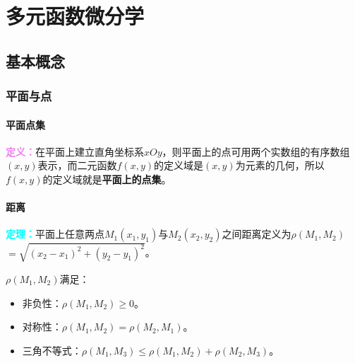 \setcounter{tocdepth}{4}
\setcounter{secnumdepth}{4}
\renewcommand{\baselinestretch}{1.5}
\chapter{多元函数微分学}
\section{基本概念}
\subsection{平面与点}
\subsubsection{平面点集}

\textcolor{violet}{\textbf{定义：}}在平面上建立直角坐标系$xOy$，则平面上的点可用两个实数组的有序数组$(x,y)$表示，而二元函数$f(x,y)$的定义域是$(x,y)$为元素的几何，所以$f(x,y)$的定义域就是\textbf{平面上的点集}。

\subsubsection{距离}

\textcolor{aqua}{\textbf{定理：}}平面上任意两点$M_1(x_1,y_1)$与$M_2(x_2,y_2)$之间距离定义为$\rho(M_1,M_2)$\\$=\sqrt{(x_2-x_1)^2+(y_2-y_1)^2}$。

$\rho(M_1,M_2)$满足：

\begin{itemize}
    \item 非负性：$\rho(M_1,M_2)\geqslant0$。
    \item 对称性：$\rho(M_1,M_2)=\rho(M_2,M_1)$。
    \item 三角不等式：$\rho(M_1,M_3)\leqslant\rho(M_1,M_2)+\rho(M_2,M_3)$。
\end{itemize}

